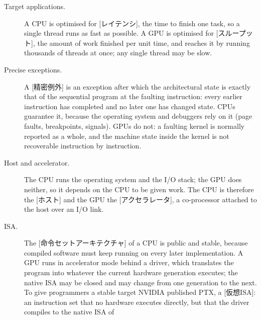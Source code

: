 \documentclass[../main.tex]{subfiles}
\begin{document}
\begin{description}
  \item[Target applications.]  A CPU is optimised for
    [レイテンシ], the time to finish one task, so a
    single thread runs as fast as possible.  A GPU is optimised for
    [スループット], the amount of work finished per
    unit time, and reaches it by running thousands of threads at once;
    any single thread may be slow.
  \item[Precise exceptions.]  A [精密例外] is
    an exception after which the architectural state is exactly that of
    the sequential program at the faulting instruction: every earlier
    instruction has completed and no later one has changed state.  CPUs
    guarantee it, because the operating system and debuggers rely on it
    (page faults, breakpoints, signals).  GPUs do not: a faulting kernel
    is normally reported as a whole, and the machine state inside the
    kernel is not recoverable instruction by instruction.
  \item[Host and accelerator.]  The CPU runs the operating system and
    the I/O stack; the GPU does neither, so it depends on the CPU to be
    given work.  The CPU is therefore the [ホスト] and the GPU
    the [アクセラレータ], a co-processor attached to the
    host over an I/O link.
  \item[ISA.]  The [命令セットアーキテクチャ]
    of a CPU is public and stable, because compiled software must keep
    running on every later implementation.  A GPU runs in accelerator
    mode behind a driver, which translates the program into whatever
    the current hardware generation executes; the native ISA may be
    closed and may change from one generation to the next.  To give
    programmers a stable target NVIDIA published PTX, a
    [仮想ISA]: an instruction set that no hardware
    executes directly, but that the driver compiles to the native ISA of

\end{description}
\end{document}

